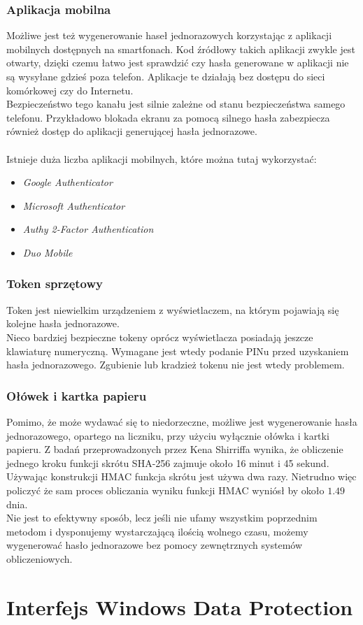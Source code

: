 \subsubsection{Aplikacja mobilna}
Możliwe jest też wygenerowanie haseł jednorazowych korzystając z aplikacji mobilnych 
dostępnych na smartfonach. Kod źródłowy takich aplikacji zwykle jest otwarty, dzięki czemu 
łatwo jest sprawdzić czy hasła generowane w aplikacji nie są wysyłane gdzieś poza telefon. 
Aplikacje te działają bez dostępu do sieci komórkowej czy do Internetu. \\
Bezpieczeństwo tego kanału jest silnie zależne od stanu bezpieczeństwa samego telefonu. 
Przykładowo blokada ekranu za pomocą silnego hasła zabezpiecza również dostęp do aplikacji generującej
hasła jednorazowe. \\ \\
Istnieje duża liczba aplikacji mobilnych, które można tutaj wykorzystać:
\begin{itemize}
	\item \textit{Google Authenticator}
	\item \textit{Microsoft Authenticator}
	\item \textit{Authy 2-Factor Authentication}
	\item \textit{Duo Mobile}
\end{itemize}

\subsubsection{Token sprzętowy}
Token jest niewielkim urządzeniem z wyświetlaczem, na którym pojawiają się kolejne hasła jednorazowe. \\
Nieco bardziej bezpieczne tokeny oprócz wyświetlacza posiadają jeszcze klawiaturę numeryczną. 
Wymagane jest wtedy podanie PINu przed uzyskaniem hasła jednorazowego. 
Zgubienie lub kradzież tokenu nie jest wtedy problemem.

\subsubsection{Ołówek i kartka papieru}
Pomimo, że może wydawać się to niedorzeczne, możliwe jest wygenerowanie hasła jednorazowego, opartego na liczniku, 
przy użyciu wyłącznie ołówka i kartki papieru. 
Z badań przeprowadzonych przez Kena Shirriffa \cite{pandp} wynika, że obliczenie jednego kroku funkcji skrótu SHA-256
zajmuje około 16 minut i 45 sekund. Używając konstrukcji HMAC funkcja skrótu jest używa dwa razy.
Nietrudno więc policzyć że sam proces obliczania wyniku funkcji HMAC wyniósł by około $1.49$ dnia. \\
Nie jest to efektywny sposób, lecz jeśli nie ufamy wszystkim poprzednim metodom i dysponujemy 
wystarczającą ilością wolnego czasu, możemy wygenerować hasło jednorazowe bez pomocy zewnętrznych 
systemów obliczeniowych.

\section{Interfejs Windows Data Protection}
